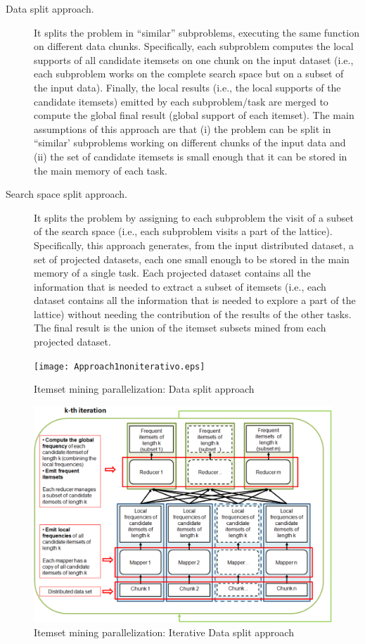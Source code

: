 \begin{description}

\item[Data split approach.]  It splits the problem in ``similar'' subproblems, executing the same function on different data chunks. Specifically, each subproblem computes the local supports of all candidate itemsets on one chunk on the input dataset (i.e., each subproblem works on the complete search space but on a subset of the input data). Finally, the local results (i.e., the local supports of the candidate itemsets) emitted by each subproblem/task are merged to compute the global final result (global support of each itemset). The main assumptions of this approach are that (i) the problem can be split in ``similar' subproblems working on different chunks of the input data and (ii) the set of candidate itemsets is small enough that it can be stored in the main memory of each task.

\item[Search space split approach.]  It splits the problem by assigning to each subproblem the visit of a subset of the search space (i.e., each subproblem visits a part of the lattice). Specifically, this approach generates, from the input distributed dataset, a set of projected datasets, each one small enough to be stored in the main memory of a single task. Each projected dataset contains all the information that is needed to extract a subset of itemsets (i.e., each dataset contains all the information that is needed to explore a part of the lattice) without needing the contribution of the results of the other tasks. The final result is the union of the itemset subsets mined from each projected dataset.

\end{description}


\begin{figure}[!t]
\texttt{[image: Approach1noniterativo.eps]}
\caption{Itemset mining parallelization: Data split approach}
\label{survey_approach1noniterativo}
\end{figure}

\begin{figure}[!t]
\includegraphics[width=5in]{Approach1.eps}
\caption{Itemset mining parallelization: Iterative Data split approach}
\label{approach1}
\end{figure}



